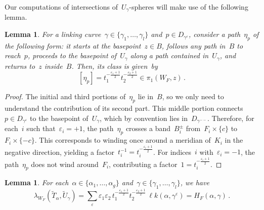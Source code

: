 \documentclass[10.9pt,a4paper]{amsart}
\newtheorem{lemma}[theorem]{Lemma}
\theoremstyle{definition}
\theoremstyle{remark}
\newcommand{\lk}{\ell k}
\begin{document}
Our computations of intersections of~$U_\gamma$-spheres will make use of the following lemma.


\begin{lemma}
\label{lemma:Pi1Term}
For a linking curve~$\gamma\in\{\gamma_1,\dots,\gamma_l\}$ and~$p \in D_{\gamma^{\varepsilon}}$, consider a path~$\eta_p$
of the following form: it starts at the basepoint~$z\in B$, follows any path in~$B$ to reach~$p$, proceeds to the basepoint of~$U_\gamma$ along a path contained in~$U_\gamma$, and returns to~$z$ inside~$B$.
Then, its class is given~by
\[
[\eta_p] = t_1^{-\frac{\varepsilon_1+1}{2}} t_2^{-\frac{\varepsilon_2+1}{2}}\in\pi_1(W_F,z)\,.
\]
\end{lemma}

\begin{proof}
The initial and third portions of~$\eta_p$ lie in~$B$, so we only need to understand the contribution of its second part.
This middle portion connects~$p \in D_{\gamma^{\varepsilon}}$ to the basepoint of~$U_\gamma$, which by convention lies in~$D_{\gamma^{--}}$. Therefore, for each~$i$ such that~$\varepsilon_i = +1$, the path~$\eta_p$ crosses a band~$B^{\pm}_i$ from~$F_i\times\{c\}$ to~$F_i\times\{-c\}$. This corresponds to winding once around a meridian of~$K_i$ in the negative direction, yielding a factor~$t_i^{-1}=t_i^{-\frac{\varepsilon_i+1}{2}}$. 
For indices~$i$ with~$\varepsilon_i = -1$, the path~$\eta_p$ does not wind around~$F_i$, contributing a factor~$1 = t_i^{-\frac{\varepsilon_i+1}{2}}$.
\end{proof}




\begin{lemma}
\label{lemma:IntTU}
For each~$\alpha\in\{\alpha_1,\dots,\alpha_g\}$ and~$\gamma\in\{\gamma_1,\dots,\gamma_l\}$, we have
\[
\lambda_{W_F}(\tilde T_{\alpha},\tilde U_{\gamma}) = \sum_{\varepsilon} \varepsilon_1\varepsilon_2\, t_1^{-\frac{\varepsilon_1+1}{2}} t_2^{-\frac{\varepsilon_2+1}{2}} \, \lk(\alpha, \gamma^\varepsilon) = H_F(\alpha, \gamma)\,.
\]
\end{lemma}
\end{document}
